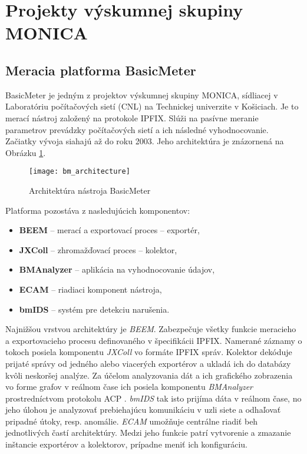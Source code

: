 \section{Projekty v\'yskumnej skupiny MONICA} \label{sec:sla}

\subsection{Meracia platforma BasicMeter}

BasicMeter \citep{monica} je jedným z projektov výskumnej 
skupiny MONICA, sídliacej v Laboratóriu počítačových sietí (CNL) na Technickej univerzite v Košiciach. 
Je to merací nástroj založený na protokole IPFIX. Slúži na pasívne meranie parametrov prevádzky 
počítačových sietí a ich následné vyhodnocovanie. Začiatky vývoja siahajú až do roku 2003. Jeho 
architektúra je znázornená na Obrázku \ref{o:bm_architecture}.

\begin{figure}[ht!]
\centering
\texttt{[image: bm\_architecture]}
\caption{Architektúra nástroja BasicMeter \citep{ja}}\label{o:bm_architecture}
\end{figure}

Platforma pozostáva z nasledujúcich komponentov:
\begin{itemize}
 \item \textbf{BEEM} -- merací a exportovací proces -- exportér,
 \item \textbf{JXColl} -- zhromažďovací proces -- kolektor,
 \item \textbf{BMAnalyzer} -- aplikácia na vyhodnocovanie údajov,
 \item \textbf{ECAM} -- riadiaci komponent nástroja,
 \item \textbf{bmIDS} -- systém pre detekciu narušenia.
\end{itemize}

Najnižšou vrstvou architektúry je \emph{BEEM}. Zabezpečuje všetky funkcie 
meracieho a exportovacieho procesu definovaného v špecifikácii IPFIX. Namerané záznamy o tokoch
posiela komponentu \emph{JXColl} vo formáte IPFIX správ. Kolektor dekóduje prijaté správy od jedného
alebo viacerých exportérov a ukladá ich do databázy kvôli neskoršej analýze. Za účelom analyzovania dát
a ich grafického zobrazenia vo forme grafov v reálnom čase ich posiela komponentu \emph{BMAnalyzer} 
prostredníctvom 
protokolu ACP \citep{ado}. \emph{bmIDS} tak isto prijíma dáta v reálnom čase, no jeho úlohou je analyzovať
prebiehajúcu komunikáciu v uzli siete a odhaľovať pripadné útoky, resp. anomálie. \emph{ECAM} umožňuje 
centrálne riadiť beh jednotlivých častí architektúry. Medzi jeho funkcie patrí vytvorenie a zmazanie 
inštancie exportérov a kolektorov, prípadne meniť ich konfiguráciu. \citep{ja, veri}

